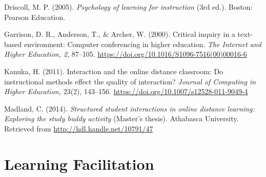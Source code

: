 \documentclass[
]{book}
\begin{document}
Driscoll, M. P. (2005). \emph{Psychology of learning for instruction} (3rd ed.). Boston: Pearson Education.

Garrison, D. R., Anderson, T., \& Archer, W. (2000). Critical inquiry in a text-based environment: Computer conferencing in higher education. \emph{The Internet and Higher Education, 2}, 87--105. \url{https://doi.org/10.1016/S1096-7516(00)00016-6}

Kanuka, H. (2011). Interaction and the online distance classroom: Do instructional methods effect the quality of interaction? \emph{Journal of Computing in Higher Education,} 23(2), 143--156. \url{https://doi.org/10.1007/s12528-011-9049-4}

Madland, C. (2014). \emph{Structured student interactions in online distance learning: Exploring the study buddy activity} (Master's thesis). Athabasca University. Retrieved from \url{http://hdl.handle.net/10791/47}

\hypertarget{learning-facilitation}{%
\chapter{Learning Facilitation}\label{learning-facilitation}}
\end{document}
